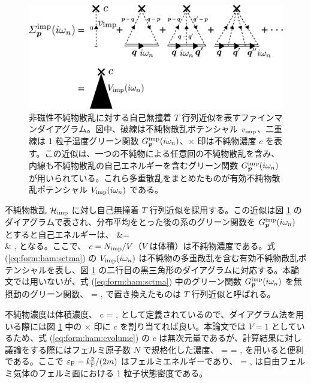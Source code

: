 \begin{figure}[t]
\begin{center}
\includegraphics[width=120mm]{eps/sig-impimp.eps}
\end{center}
\caption{非磁性不純物散乱に対する自己無撞着 $T$ 行列近似を表すファインマンダイアグラム。図中、破線は不純物散乱ポテンシャル $v_{\text{imp}}$、二重線は 1 粒子温度グリーン関数 $G^{\text{imp}}_{\bm{p}}(i\omega_n)$、$\times$ 印は不純物濃度 $c$ を表す。この近似は、一つの不純物による任意回の不純物散乱を含み、内線も不純物散乱の自己エネルギーを含むグリーン関数 $G^{\text{imp}}_{\bm{p}}(i\omega_n)$ が用いられている。これら多重散乱をまとめたものが有効不純物散乱ポテンシャル $V_{\text{imp}} (i\omega_n)$ である。}
\label{fig:form:ham:sigimp}
\end{figure}


不純物散乱 $\mathcal{H}_{\text{imp}}$ に対し自己無撞着 $T$ 行列近似を採用する。この近似は図 \ref{fig:form:ham:sigimp} のダイアグラムで表され、分布平均をとった後の系のグリーン関数を $G^{\text{imp}}_{\bm{p}}(i\omega_n)$ とすると自己エネルギーは、
\beq
\sigimppom &= \con \vimp {}\notag\\
& \equiv \con \vvtxn,\label{eq:form:ham:sctma}
\eeq 
となる。ここで、 $c=N_{\text{imp}}/V$（$V$ は体積）は不純物濃度である。式 (\ref{eq:form:ham:sctma}) の $V_{\text{imp}} (i\omega_n)$ は不純物の多重散乱を含む有効不純物散乱ポテンシャルを表し、図 \ref{fig:form:ham:sigimp} の二行目の黒三角形のダイアグラムに対応する。本論文では用いないが、式 (\ref{eq:form:ham:sctma}) 中のグリーン関数 $G^{\text{imp}}_{\bm{p}}(i\omega_n)$ を無摂動のグリーン関数、
\beq
\gzrpom = ,
\eeq
で置き換えたものは $T$ 行列近似と呼ばれる。

不純物濃度は体積濃度、
\beq
c = ,\label{eq:form:ham:cvolume}
\eeq
として定義されているので、ダイアグラム法を用いる際には図 \ref{fig:form:ham:sigimp} 中の $\times$ 印に $c$ を割り当てれば良い。本論文では $V=1$ としているため、式 (\ref{eq:form:ham:cvolume}) の $c$ は無次元量であるが、計算結果に対し議論をする際にはフェルミ原子数 $N$ で規格化した濃度、
\beq
{}= =  ,\label{eq:form:ham:overlinec}
\eeq
を用いると便利である。ここで $\varepsilon_{\text{F}} = k_{\text{F}}^2/(2m)$ はフェルミエネルギーであり、
\beq
\fdos = ,
\eeq
は自由フェルミ気体のフェルミ面における 1 粒子状態密度である。

